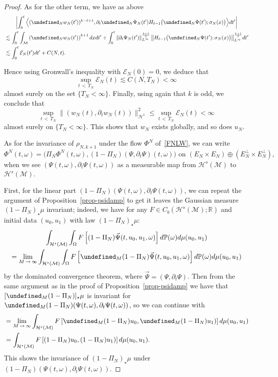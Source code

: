 \documentclass[10pt]{amsart}
\theoremstyle{definition}\newtheorem{defi}[theo]{Definition}\newtheorem{rema}[theo]{Remark}\newtheorem{exam}[theo]{Example}\newtheorem{exem}[theo]{Example}\newtheorem{nota}[theo]{Notation}
\newcommand{\R}{\mathbb{R}}
\newcommand{\Prob}{\mathbb{P}}
\let\P= \undefined
\newcommand{\P}{\mathbf{P}}
\newcommand{\En}{\mathcal{E}}
\newcommand{\M}{\mathcal{M}}
\renewcommand{\H}{\mathcal{H}}
\newcommand{\s}{\sigma}
\newcommand{\dt}{\partial_t}
\renewcommand{\o}{\omega}
\renewcommand{\O}{\Omega}
\newcommand{\les}{\lesssim}
\begin{document}
\begin{proof}
As for the other term, we have as above
\begin{multline*}
\left|\int_0^t\Big\langle (\P_Nw_N(t'))^{k-\ell+1},\dt\P_N\Psi_N(t') H_{\ell-1}\big(\P_N\Psi(t');\s_N(x)\big)\Big\rangle dt'\right|\\
\begin{aligned}
&\les \int_0^t\int_{\M}\left(\P_Nw_N(t')\right)^{k+1}dxdt' + \int_0^t\left\|\dt\Psi_N(t')\right\|_{L^\infty}^{\frac{k+1}\ell}\big\|H_{\ell-1}\big(\P_N\Psi(t');\s_N(x)\big)\big\|_{L^\infty}^{\frac{k+1}\ell}dt'\\
&\les \int_0^t\En_N(t')dt' + C(N,t).
\end{aligned}
\end{multline*}

Hence using Gronwall's inequality with $\En_N(0)=0$, we deduce that
\begin{equation*}
\sup_{t\,<\,T_N}\En_N(t) \les C(N,T_N) <\infty
\end{equation*}
almost surely on the set $\{T_N<\infty\}$. Finally, using again that $k$ is odd, we conclude that
\begin{equation*}
\sup_{t\,<\,T_N}\|(w_N(t),\dt w_N(t))\|_{\H^{1}}^2 \le \sup_{t\,<\,T_N}\En_N(t) <\infty
\end{equation*}
almost surely on $\{T_N<\infty\}$. This shows that $w_N$ exists globally, and so does $u_N$.


As for the invariance of $\rho_{N,k+1}$ under the flow $\Phi^N$ of~\eqref{FNLW}, we can write
\begin{equation*}
\Phi^N(t,\o) = \big(\Pi_N\Phi^N(t,\o), (1-\Pi_N)(\Psi,\dt\Psi)(t,\o)\big) \text{ on }\left(E_N\times E_N\right)\oplus \left(E_N^{\perp}\times E_N^{\perp}\right),
\end{equation*}
when we see $(\Psi(t,\o),\dt\Psi(t,\o))$ as a measurable map from $\H^s(\M)$ to $\H^s(\M)$.

First, for the linear part $(1-\Pi_N)(\Psi(t,\o),\dt\Psi(t,\o))$, we can repeat the argument of Proposition~\ref{prop-psidamp} to get it leaves the Gaussian measure $(1-\Pi_N)_\star\mu$ invariant; indeed, we have for any $F\in C_b(\H^s(\M);\R)$ and initial data $(u_0,u_1)$ with law $(1-\Pi_N)_\star\mu$:
\begin{multline*}
\int_{\H^s(\M)}\int_\O F\left[(1-\Pi_N)\vec\Psi(t,u_0,u_1,\o)\right]d\Prob(\o)d\mu(u_0,u_1)\\
=\lim_{M\,\to\,\infty}\int_{\H^s(\M)}\int_\O F\left[\P_M(1-\Pi_N)\vec\Psi(t,u_0,u_1,\o)\right]d\Prob(\o)d\mu(u_0,u_1)
\end{multline*}
by the dominated convergence theorem, where $\vec\Psi=(\Psi,\dt\Psi)$. Then from the same argument as in the proof of Proposition~\ref{prop-psidamp} we have that $[\P_M(1-\Pi_N)]_\star\mu$ is invariant for $\P_M(1-\Pi_N)(\Psi(t,\o),\dt\Psi(t,\o))$, so we can continue with
\begin{align*}
&=\lim_{M\,\to\,\infty}\int_{\H^s(\M)}F\left[\P_M(1-\Pi_N) u_0,\P_M(1-\Pi_N)u_1)\right]d\mu(u_0,u_1)\\
&=\int_{\H^s(\M)}F\left[(1-\Pi_N) u_0,(1-\Pi_N)u_1)\right]d\mu(u_0,u_1).
\end{align*}
This shows the invariance of $(1-\Pi_N)_\star\mu$ under $(1-\Pi_N)(\Psi(t,\o),\dt\Psi(t,\o))$.


\end{proof}
\end{document}

